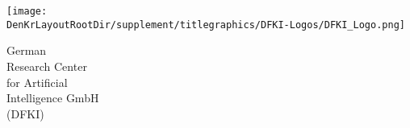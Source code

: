 %
%
%
\begin{minipage}{0.4\textwidth}%
\begin{flushleft}%
\texttt{[image: \\DenKrLayoutRootDir/supplement/titlegraphics/DFKI-Logos/DFKI\_Logo.png]}%
\textsc{\Large }%
\end{flushleft}%
\end{minipage}%
\hfill%
\begin{minipage}{0.5\textwidth}%
\begin{flushright}%
{\Large\sffamily German}\\%
{\Large\sffamily Research Center}\\%
{\Large\sffamily for Artificial}\\%
{\Large\sffamily Intelligence GmbH}\\%
{\Large\sffamily (DFKI)}%
\end{flushright}%
\end{minipage}%
%
\vspace*{0.05\textheight}%
%

%

%
%